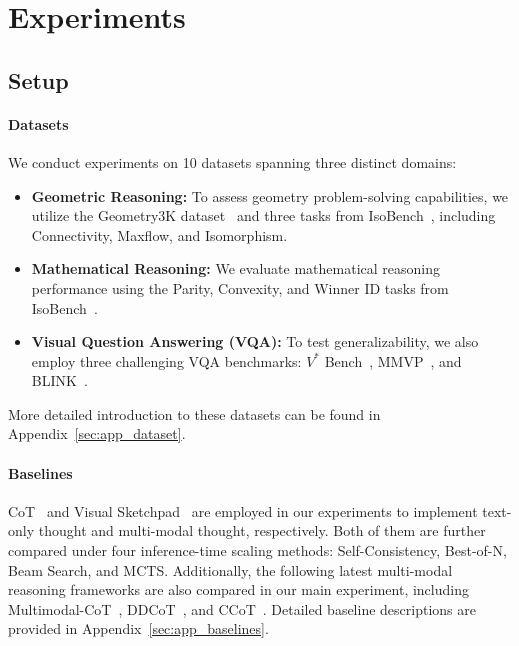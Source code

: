 





\section{Experiments}

\subsection{Setup}
\paragraph{Datasets}
We conduct experiments on 10 datasets spanning three distinct domains:
\begin{itemize}[leftmargin=*]
\item \textbf{Geometric Reasoning:} To assess geometry problem-solving capabilities, we utilize the Geometry3K dataset~\cite{geometry3k} and three tasks from IsoBench~\cite{isobench}, including Connectivity, Maxflow, and Isomorphism.
\item \textbf{Mathematical Reasoning:} We evaluate mathematical reasoning performance using the Parity, Convexity, and Winner ID tasks from IsoBench~\cite{isobench}.
\item \textbf{Visual Question Answering (VQA):} To test generalizability, we also employ three challenging VQA benchmarks: $V^*$ Bench~\cite{vstar}, MMVP~\cite{mmvp}, and BLINK~\cite{blink}.
\end{itemize}

More detailed introduction to these datasets can be found in Appendix~\ref{sec:app_dataset}.



\paragraph{Baselines}
CoT~\cite{cot} and Visual Sketchpad~\cite{vsk} are employed in our experiments to implement text-only thought and multi-modal thought, respectively. Both of them are further compared under four inference-time scaling methods: Self-Consistency, Best-of-N, Beam Search, and MCTS. Additionally, the following latest multi-modal reasoning frameworks are also compared in our main experiment, including Multimodal-CoT~\cite{mcot}, DDCoT~\cite{ddcot}, and CCoT~\cite{ccot}. Detailed baseline descriptions are provided in Appendix~\ref{sec:app_baselines}.


